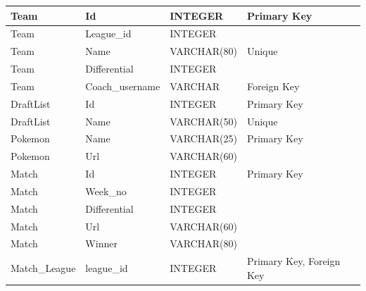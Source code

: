 \documentclass{article}
\begin{document}
\begin{table}[H]
\begin{tabular}{|l|l|l|l|}
    {\color[HTML]{2E3436} Team} & {\color[HTML]{2E3436} Id} & {\color[HTML]{2E3436} INTEGER} & {\color[HTML]{2E3436} Primary Key} \\ \hline
    {\color[HTML]{2E3436} Team} & {\color[HTML]{2E3436} League\_id} & {\color[HTML]{2E3436} INTEGER} & {\color[HTML]{2E3436} } \\ \hline
    {\color[HTML]{2E3436} Team} & {\color[HTML]{2E3436} Name} & {\color[HTML]{2E3436} VARCHAR(80)} & {\color[HTML]{2E3436} Unique} \\ \hline
    {\color[HTML]{2E3436} Team} & {\color[HTML]{2E3436} Differential} & {\color[HTML]{2E3436} INTEGER} & {\color[HTML]{2E3436} } \\ \hline
    {\color[HTML]{2E3436} Team} & {\color[HTML]{2E3436} Coach\_username} & {\color[HTML]{2E3436} VARCHAR} & {\color[HTML]{2E3436} Foreign Key} \\ \hline
    {\color[HTML]{2E3436} DraftList} & {\color[HTML]{2E3436} Id} & {\color[HTML]{2E3436} INTEGER} & {\color[HTML]{2E3436} Primary Key} \\ \hline
    {\color[HTML]{2E3436} DraftList} & {\color[HTML]{2E3436} Name} & {\color[HTML]{2E3436} VARCHAR(50)} & {\color[HTML]{2E3436} Unique} \\ \hline
    {\color[HTML]{2E3436} Pokemon} & {\color[HTML]{2E3436} Name} & {\color[HTML]{2E3436} VARCHAR(25)} & {\color[HTML]{2E3436} Primary Key} \\ \hline
    {\color[HTML]{2E3436} Pokemon} & {\color[HTML]{2E3436} Url} & {\color[HTML]{2E3436} VARCHAR(60)} & {\color[HTML]{2E3436} } \\ \hline
    {\color[HTML]{2E3436} Match} & {\color[HTML]{2E3436} Id} & {\color[HTML]{2E3436} INTEGER} & {\color[HTML]{2E3436} Primary Key} \\ \hline
    {\color[HTML]{2E3436} Match} & {\color[HTML]{2E3436} Week\_no} & {\color[HTML]{2E3436} INTEGER} & {\color[HTML]{2E3436} } \\ \hline
    {\color[HTML]{2E3436} Match} & {\color[HTML]{2E3436} Differential} & {\color[HTML]{2E3436} INTEGER} & {\color[HTML]{2E3436} } \\ \hline
    {\color[HTML]{2E3436} Match} & {\color[HTML]{2E3436} Url} & {\color[HTML]{2E3436} VARCHAR(60)} & {\color[HTML]{2E3436} } \\ \hline
    {\color[HTML]{2E3436} Match} & {\color[HTML]{2E3436} Winner} & {\color[HTML]{2E3436} VARCHAR(80)} & {\color[HTML]{2E3436} } \\ \hline
    {\color[HTML]{2E3436} Match\_League} & {\color[HTML]{2E3436} league\_id} & {\color[HTML]{2E3436} INTEGER} & {\color[HTML]{2E3436} Primary Key, Foreign Key} \\ \hline

\end{tabular}
\end{table}
\end{document}
